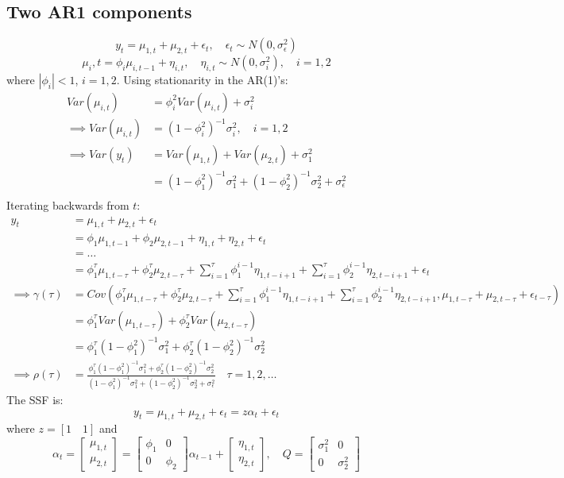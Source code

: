 \documentclass[DIV=14,titlepage=false]{scrreprt}
\begin{document}
\subsection{Two AR1 components}
\[
    y_t = \mu_{1,t} + \mu_{2,t} + \epsilon_t, \quad \epsilon_t \sim N(0, \sigma^2_\epsilon)
\]
\[
    \mu_i,t = \phi_i \mu_{i,t-1} + \eta_{i,t}, \quad \eta_{i,t} \sim N(0, \sigma^2_{i}), \quad i=1,2
\]
where $|\phi_i|<1$, $i=1,2$.
Using stationarity in the AR(1)'s:
\begin{align*}
    Var(\mu_{i,t}) &= \phi_i^2 Var(\mu_{i,t}) + \sigma^2_{i}\\
    \implies Var(\mu_{i,t}) &= (1-\phi^2_i)^{-1} \sigma^2_{i}, \quad i=1,2\\
    \implies Var (y_t) &= Var (\mu_{1,t}) + Var (\mu_{2,t}) + \sigma^2_1\\
    &= (1-\phi^2_1)^{-1} \sigma^2_{1} + (1-\phi^2_2)^{-1} \sigma^2_{2} + \sigma^2_\epsilon\\
\end{align*}
Iterating backwards from $t$:
\begin{align*}
    y_t &= \mu_{1,t} + \mu_{2,t} + \epsilon_t\\
    &= \phi_1 \mu_{1,t-1} + \phi_2 \mu_{2,t-1} + \eta_{1,t} + \eta_{2,t} + \epsilon_t\\
    &= \dots\\
    &= \phi_1^\tau \mu_{1,t-\tau} + \phi_2^\tau \mu_{2,t-\tau} + \sum_{i=1}^\tau \phi_1^{i-1} \eta_{1,t-i+1} + \sum_{i=1}^\tau \phi_2^{i-1} \eta_{2,t-i+1} + \epsilon_t\\
    \implies \gamma(\tau) &= Cov( \phi_1^\tau \mu_{1,t-\tau} + \phi_2^\tau \mu_{2,t-\tau} + \sum_{i=1}^\tau \phi_1^{i-1} \eta_{1,t-i+1} + \sum_{i=1}^\tau \phi_2^{i-1} \eta_{2,t-i+1}, \mu_{1,t-\tau} + \mu_{2,t-\tau} + \epsilon_{t-\tau})\\
    &= \phi_1^\tau Var(\mu_{1,t-\tau}) + \phi_2^\tau Var(\mu_{2,t-\tau})\\
    &= \phi_1^\tau (1-\phi_1^2)^{-1} \sigma^2_1 + \phi_2^\tau (1-\phi_2^2)^{-1} \sigma^2_2\\
    \implies \rho(\tau) &= \frac{\phi_1^\tau (1-\phi_1^2)^{-1} \sigma^2_1 + \phi_2^\tau (1-\phi_2^2)^{-1} \sigma^2_2}{(1-\phi^2_1)^{-1} \sigma^2_{1} + (1-\phi^2_2)^{-1} \sigma^2_{2} + \sigma^2_\epsilon} \quad \tau = 1,2,\dots
\end{align*}
The SSF is:
\[
    y_t = \mu_{1,t} + \mu_{2,t} + \epsilon_t = z \alpha_t + \epsilon_t
\]
where $z = [1 \quad 1]$ and 
\[
    \alpha_t = 
    \begin{bmatrix}
        \mu_{1,t} \\ 
        \mu_{2,t}
    \end{bmatrix} = 
    \begin{bmatrix}
        \phi_1 & 0 \\ 
        0 & \phi_2
    \end{bmatrix} \alpha_{t-1} +
    \begin{bmatrix}
        \eta_{1,t} \\ 
        \eta_{2,t}
    \end{bmatrix}, \quad Q= \begin{bmatrix}
        \sigma^2_1 & 0 \\ 
        0 & \sigma^2_2
    \end{bmatrix}
\]
\end{document}
